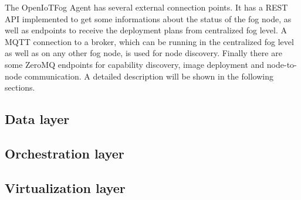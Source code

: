 The OpenIoTFog Agent has several external connection points.
It has a \ac{REST} \ac{API} implemented to get some informations about the status of the fog node, as well as endpoints to receive the deployment plans from centralized fog level.
A \ac{MQTT} connection to a broker, which can be running in the centralized fog level as well as on any other fog node, is used for node discovery.
Finally there are some ZeroMQ endpoints for capability discovery, image deployment and node-to-node communication.
A detailed description will be shown in the following sections.


\subsection{Data layer}
\doit

\subsection{Orchestration layer}
\doit

\subsection{Virtualization layer}
\doit

